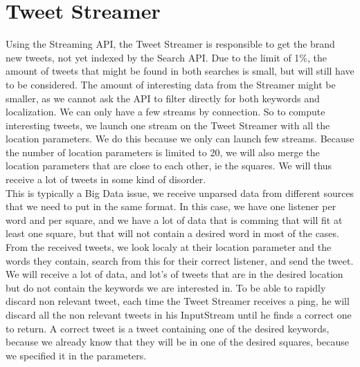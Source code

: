 \section{Tweet Streamer}
Using the Streaming API, the Tweet Streamer is responsible to get the brand new tweets, not yet indexed by the Search API. Due to the limit of 1\%, the amount of tweets that might be found in both searches is small, but will still have to be considered. The amount of interesting data from the Streamer might be smaller, as we cannot ask the API to filter directly for both keywords and localization. We can only have a few streams by connection. So to compute interesting tweets, we launch one stream on the Tweet Streamer with all the location parameters. We do this because we only can launch few streams. Because the number of location parameters is limited to 20, we will also merge the location parameters that are close to each other, ie the squares. We will thus receive a lot of tweets in some kind of disorder. \\
This is typically a Big Data issue, we receive unparsed data from different sources that we need to put in the same format. In this case, we have one listener per word and per square, and we have a lot of data that is comming that will fit at least one square, but that will not contain a desired word in most of the cases.\\
From the received tweets, we look localy at their location parameter and the words they contain, search from this for their correct listener, and send the tweet. We will receive a lot of data, and lot's of tweets that are in the desired location but do not contain the keywords we are interested in. To be able to rapidly discard non relevant tweet, each time the Tweet Streamer receives a ping, he will discard all the non relevant tweets in his InputStream until he finds a correct one to return. A correct tweet is a tweet containing one of the desired keywords, because we already know that they will be in one of the desired squares, because we specified it in the parameters.
